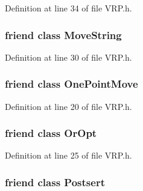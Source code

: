 Definition at line 34 of file VRP.h.

\hypertarget{class_v_r_p_a639ad495d8fe15a35cd86e1e1bf86864}{
\subsubsection[{MoveString}]{\setlength{\rightskip}{0pt plus 5cm}friend class {\bf MoveString}}}
\label{class_v_r_p_a639ad495d8fe15a35cd86e1e1bf86864}


Definition at line 30 of file VRP.h.

\hypertarget{class_v_r_p_a3eb7e09375cb9efb60e174576602cc2a}{
\subsubsection[{OnePointMove}]{\setlength{\rightskip}{0pt plus 5cm}friend class {\bf OnePointMove}}}
\label{class_v_r_p_a3eb7e09375cb9efb60e174576602cc2a}


Definition at line 20 of file VRP.h.

\hypertarget{class_v_r_p_aad4e90257d9562aaba2f6cb67b18b0b4}{
\subsubsection[{OrOpt}]{\setlength{\rightskip}{0pt plus 5cm}friend class {\bf OrOpt}}}
\label{class_v_r_p_aad4e90257d9562aaba2f6cb67b18b0b4}


Definition at line 25 of file VRP.h.

\hypertarget{class_v_r_p_a0db13b3e7109396073d590aa1a62d0ec}{
\subsubsection[{Postsert}]{\setlength{\rightskip}{0pt plus 5cm}friend class {\bf Postsert}}}
\label{class_v_r_p_a0db13b3e7109396073d590aa1a62d0ec}


